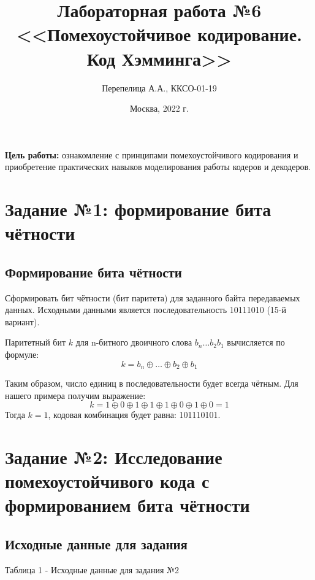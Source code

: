 \documentclass[11pt]{article}
\title{\textbf{Лабораторная работа №6\\<<Помехоустойчивое кодирование. Код Хэмминга>>}}
\author{Перепелица А.А., ККСО-01-19}
\date{Москва, 2022 г.}
\begin{document}
\maketitle
\thispagestyle{empty}
\textbf{Цель работы:}  ознакомление с принципами помехоустойчивого кодирования и приобретение практических навыков моделирования работы кодеров и декодеров. 

\section{Задание №1: формирование бита чётности}

\subsection{Формирование бита чётности}
Сформировать бит чётности (бит паритета) для заданного байта передаваемых данных. Исходными данными является последовательность 10111010 (15-й вариант).

Паритетный бит $k$ для n-битного двоичного слова $b_n \ldots b_2 b_1$ вычисляется по формуле:
$$
k=b_n \oplus \ldots \oplus b_2 \oplus b_1
$$

Таким образом, число единиц в последовательности будет всегда чётным. Для нашего примера получим выражение:
$$
k= 1 \oplus 0 \oplus 1\oplus 1\oplus 1\oplus 0\oplus 1\oplus 0 = 1
$$
Тогда $k=1$, кодовая комбинация будет равна: 101110101.

\newpage

\section{Задание №2: Исследование помехоустойчивого кода с формированием бита чётности}

\subsection{Исходные данные для задания}

\begin{table}[H]
    \end{table}
\begin{center}
    Таблица 1 - Исходные данные для задания №2
\end{center}
\end{document}
